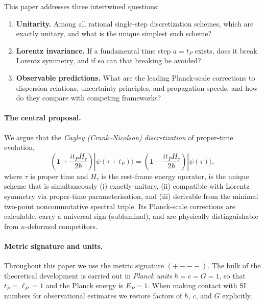\documentclass[12pt,a4paper]{article}
\begin{document}
This paper addresses three intertwined questions:
\begin{enumerate}
  \item \textbf{Unitarity.} Among all rational single-step discretization schemes, which
        are exactly unitary, and what is the unique simplest such scheme?
  \item \textbf{Lorentz invariance.} If a fundamental time step $a = t_P$ exists, does it
        break Lorentz symmetry, and if so can that breaking be avoided?
  \item \textbf{Observable predictions.} What are the leading Planck-scale corrections to
        dispersion relations, uncertainty principles, and propagation speeds, and how do
        they compare with competing frameworks?
\end{enumerate}

\paragraph{The central proposal.}
We argue that the \emph{Cayley (Crank--Nicolson) discretization} of proper-time
evolution,
\begin{equation}
  \left(\mathbf{1} + \frac{i t_P H_\tau}{2\hbar}\right)|\psi(\tau + t_P)\rangle
  = \left(\mathbf{1} - \frac{i t_P H_\tau}{2\hbar}\right)|\psi(\tau)\rangle,
  \label{eq:cayley_evolution}
\end{equation}
where $\tau$ is proper time and $H_\tau$ is the rest-frame energy operator, is the unique
scheme that is simultaneously (i) exactly unitary, (ii) compatible with Lorentz symmetry
via proper-time parameterisation, and (iii) derivable from the minimal two-point
noncommutative spectral triple. Its Planck-scale corrections are calculable, carry a
universal sign (subluminal), and are physically distinguishable from $\kappa$-deformed
competitors.

\paragraph{Metric signature and units.}
Throughout this paper we use the metric signature $(+{-}{-}{-})$.  The bulk of the
theoretical development is carried out in \emph{Planck units} $\hbar = c = G = 1$, so
that $t_P = \ell_P = 1$ and the Planck energy is $E_P = 1$.  When making contact with SI
numbers for observational estimates we restore factors of $\hbar$, $c$, and $G$
explicitly.
\end{document}
